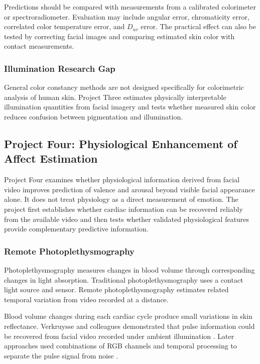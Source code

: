 \documentclass[12pt]{article}
\begin{document}
Predictions should be compared with measurements from a calibrated colorimeter or spectroradiometer. Evaluation may include angular error, chromaticity error, correlated color temperature error, and \(D_{uv}\) error. The practical effect can also be tested by correcting facial images and comparing estimated skin color with contact measurements.

\subsubsection{Illumination Research Gap}

General color constancy methods are not designed specifically for colorimetric analysis of human skin. Project Three estimates physically interpretable illumination quantities from facial imagery and tests whether measured skin color reduces confusion between pigmentation and illumination.

\subsection{Project Four: Physiological Enhancement of Affect Estimation}

Project Four examines whether physiological information derived from facial video improves prediction of valence and arousal beyond visible facial appearance alone. It does not treat physiology as a direct measurement of emotion. The project first establishes whether cardiac information can be recovered reliably from the available video and then tests whether validated physiological features provide complementary predictive information.

\subsubsection{Remote Photoplethysmography}

Photoplethysmography measures changes in blood volume through corresponding changes in light absorption. Traditional photoplethysmography uses a contact light source and sensor. Remote photoplethysmography estimates related temporal variation from video recorded at a distance.

Blood volume changes during each cardiac cycle produce small variations in skin reflectance. Verkruysse and colleagues demonstrated that pulse information could be recovered from facial video recorded under ambient illumination \cite{verkruysse2008}. Later approaches used combinations of RGB channels and temporal processing to separate the pulse signal from noise \cite{poh2010,dehaan2013,wang2017}.
\end{document}
